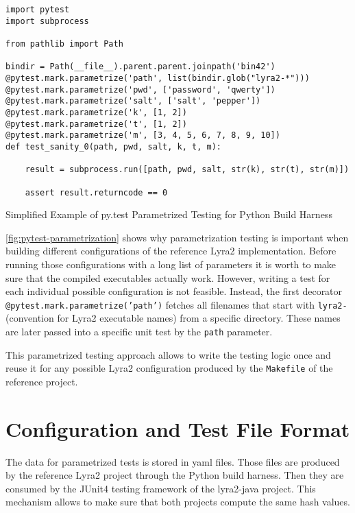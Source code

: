 \begin{listing}
\begin{verbatim}
import pytest
import subprocess

from pathlib import Path

bindir = Path(__file__).parent.parent.joinpath('bin42')
@pytest.mark.parametrize('path', list(bindir.glob("lyra2-*")))
@pytest.mark.parametrize('pwd', ['password', 'qwerty'])
@pytest.mark.parametrize('salt', ['salt', 'pepper'])
@pytest.mark.parametrize('k', [1, 2])
@pytest.mark.parametrize('t', [1, 2])
@pytest.mark.parametrize('m', [3, 4, 5, 6, 7, 8, 9, 10])
def test_sanity_0(path, pwd, salt, k, t, m):

    result = subprocess.run([path, pwd, salt, str(k), str(t), str(m)])

    assert result.returncode == 0
\end{verbatim}
\caption{Simplified Example of py.test Parametrized Testing for Python Build Harness}
\label{fig:pytest-parametrization}
\end{listing}

\autoref{fig:pytest-parametrization} shows why parametrization testing is important when building different configurations of the reference Lyra2 implementation. Before running those configurations with a long list of parameters it is worth to make sure that the compiled executables actually work. However, writing a test for each individual possible configuration is not feasible. Instead, the first decorator \texttt{@pytest.mark.parametrize('path')} fetches all filenames that start with \texttt{lyra2-} (convention for Lyra2 executable names) from a specific directory. These names are later passed into a specific unit test by the \texttt{path} parameter.

This parametrized testing approach allows to write the testing logic once and reuse it for any possible Lyra2 configuration produced by the \texttt{Makefile} of the reference project.

\section{Configuration and Test File Format}
\label{sec:configuration-and-test-file-format}

The data for parametrized tests is stored in \gls{yaml} files. Those files are produced by the reference Lyra2 project through the Python build harness. Then they are consumed by the JUnit4 testing framework of the lyra2-java project. This mechanism allows to make sure that both projects compute the same hash values.


